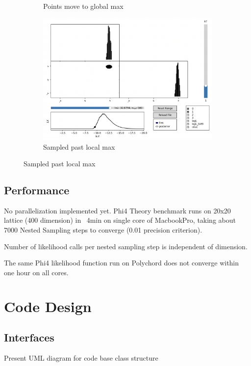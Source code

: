 \documentclass[11pt]{article}
\begin{document}
\begin{figure}[H]
\begin{subfigure}[b]{0.3\linewidth}
            \caption{Points move to global max}
        \end{subfigure}
        \begin{subfigure}[b]{0.3\linewidth}
            \centering
            \includegraphics[width=\linewidth]{../figures/topotrap/NS3}
            \caption{Sampled past local max}
        \end{subfigure}
        \label{dig:topotrap_ns}
    \end{figure}


    \subsection{Performance}
    No parallelization implemented yet.
    Phi4 Theory benchmark runs on 20x20 lattice (400 dimension) in ~4min on single core of MacbookPro,
    taking about 7000 Nested Sampling steps to converge (0.01 precision criterion).

    Number of likelihood calls per nested sampling step is independent of dimension.

    The same Phi4 likelihood function run on Polychord does not converge within one hour on all cores.

    \newpage
    \appendix
    \section{Code Design}
    \subsection{Interfaces}
    Present UML diagram for code base class structure
\end{document}
